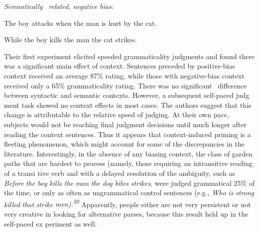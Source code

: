 \clearpage\setcounter{page}{1}\setcounter{listWWNumxxivleveli}{18}
\begin{listWWNumxxivleveli}
\item 
\begin{styleStandard}
\textit{Semantically }\textit{\ }\textit{related,}\textit{ }\textit{negative}\textit{ }\textit{bias:}
\end{styleStandard}


\setcounter{listWWNumxxivlevelii}{0}
\begin{listWWNumxxivlevelii}
\item 
\begin{styleStandard}
The boy attacks when the man is hurt by the cat.
\end{styleStandard}


\item 
\begin{styleStandard}
While the boy kills the man the cat strikes.
\end{styleStandard}


\end{listWWNumxxivlevelii}
\end{listWWNumxxivleveli}
\begin{styleStandard}
Their first experiment elicited speeded grammaticality judgments and found there was a significant main effect of context. Sentences preceded by positive-bias context received an average 87\% rating, while those with negative-bias context received only a 65\% grammaticality rating. There was no significant \ difference between syntactic and semantic contexts. However, a subsequent self-paced judg\- ment task showed no context effects in most cases. The authors suggest that this change is attributable to the relative speed of judging. At their own pace, subjects would not be reaching final judgment decisions until much longer after reading the context sentences. Thus it appears that context-induced priming is a fleeting phenomenon, which might account for some of the discrepancies in the literature. Interestingly, in the absence of any biasing context, the class of garden paths that are hardest to process (namely, those requiring an intransitive reading of a transi\- tive verb and with a delayed resolution of the ambiguity, such as \textit{Before}\textit{ }\textit{the}\textit{ }\textit{boy}\textit{ }\textit{kills}\textit{ }\textit{the}\textit{ }\textit{man}\textit{ }\textit{the}\textit{ }\textit{dog}\textit{ }\textit{bites}\textit{ }\textit{strikes,}\textit{ }were judged grammatical 25\% of the time, or only as often as ungrammatical control sentences (e.g., \textit{Who}\textit{ }\textit{is}\textit{ }\textit{strong}\textit{ }\textit{killed}\textit{ }\textit{that}\textit{ }\textit{strike}\textit{ }\textit{men}\textit{).}\textit{\textsuperscript{20}}\textit{\textsuperscript{ }}Apparently, people either are not very persistent or not very creative in looking for alternative parses, because this result held up in the self-paced ex\- periment as well.
\end{styleStandard}



